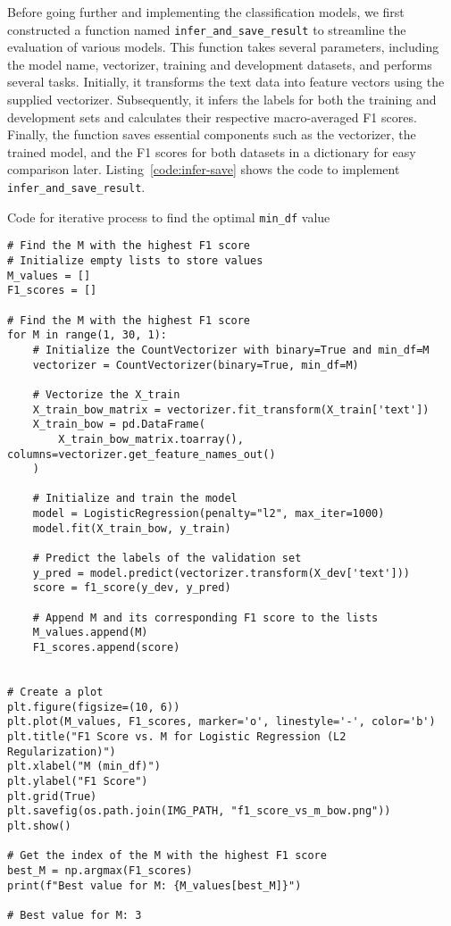 \documentclass{article}
\begin{document}
Before going further and implementing the classification models, we first constructed a function named \texttt{infer\_and\_save\_result} to streamline the evaluation of various models. This function takes several parameters, including the model name, vectorizer, training and development datasets, and performs several tasks. Initially, it transforms the text data into feature vectors using the supplied vectorizer. Subsequently, it infers the labels for both the training and development sets and calculates their respective macro-averaged F1 scores. Finally, the function saves essential components such as the vectorizer, the trained model, and the F1 scores for both datasets in a dictionary for easy comparison later. Listing~\ref{code:infer-save} shows the code to implement \texttt{infer\_and\_save\_result}.

\begin{listing}[H]
\caption{Code for iterative process to find the optimal \texttt{min\_df} value}
\label{code:bow-min_df}
\begin{verbatim}
# Find the M with the highest F1 score
# Initialize empty lists to store values
M_values = []
F1_scores = []

# Find the M with the highest F1 score
for M in range(1, 30, 1):
    # Initialize the CountVectorizer with binary=True and min_df=M
    vectorizer = CountVectorizer(binary=True, min_df=M)

    # Vectorize the X_train
    X_train_bow_matrix = vectorizer.fit_transform(X_train['text'])
    X_train_bow = pd.DataFrame(
        X_train_bow_matrix.toarray(), columns=vectorizer.get_feature_names_out()
    )
    
    # Initialize and train the model
    model = LogisticRegression(penalty="l2", max_iter=1000)
    model.fit(X_train_bow, y_train)

    # Predict the labels of the validation set
    y_pred = model.predict(vectorizer.transform(X_dev['text']))
    score = f1_score(y_dev, y_pred)

    # Append M and its corresponding F1 score to the lists
    M_values.append(M)
    F1_scores.append(score)
    
    
# Create a plot
plt.figure(figsize=(10, 6))
plt.plot(M_values, F1_scores, marker='o', linestyle='-', color='b')
plt.title("F1 Score vs. M for Logistic Regression (L2 Regularization)")
plt.xlabel("M (min_df)")
plt.ylabel("F1 Score")
plt.grid(True)
plt.savefig(os.path.join(IMG_PATH, "f1_score_vs_m_bow.png"))
plt.show()

# Get the index of the M with the highest F1 score
best_M = np.argmax(F1_scores)
print(f"Best value for M: {M_values[best_M]}")

# Best value for M: 3
\end{verbatim}
\end{listing}
\end{document}
